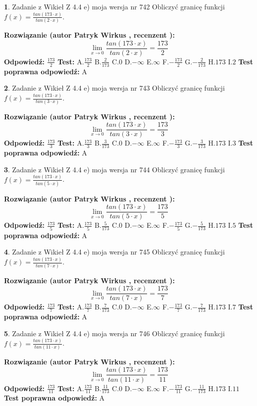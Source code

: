 \documentclass[12pt, a4paper]{article}
\theoremstyle{definition} %
\newtheorem{zad}{}
\newcommand{\zadStart}[1]{\begin{zad}#1\newline}
\newcommand{\zadStop}{\end{zad}}
\newcommand{\rozwStart}[2]{\noindent \textbf{Rozwiązanie (autor #1 , recenzent #2): }\newline}
\newcommand{\rozwStop}{\newline}
\newcommand{\odpStart}{\noindent \textbf{Odpowiedź:}\newline}
\newcommand{\odpStop}{\newline}
\newcommand{\testStart}{\noindent \textbf{Test:}\newline}
\newcommand{\testStop}{\newline}
\newcommand{\kluczStart}{\noindent \textbf{Test poprawna odpowiedź:}\newline}
\newcommand{\kluczStop}{\newline}
\begin{document}
\zadStart{Zadanie z Wikieł Z 4.4 e) moja wersja nr 742}
Obliczyć granicę funkcji $f(x)=\frac{tan(173\cdot x)}{tan(2\cdot x)}$.
\zadStop
\rozwStart{Patryk Wirkus}{}
$$\lim\limits_{x\to 0}\frac{tan(173\cdot x)}{tan(2\cdot x)}=
\frac{173}{2}$$
\rozwStop
\odpStart
$\frac{173}{2}$
\odpStop
\testStart
A.$\frac{173}{2}$
B.$\frac{2}{173}$
C.$0$
D.$-\infty$
E.$\infty$
F.$-\frac{173}{2}$
G.$-\frac{2}{173}$
H.$173$
I.$2$
\testStop
\kluczStart
A
\kluczStop



\zadStart{Zadanie z Wikieł Z 4.4 e) moja wersja nr 743}
Obliczyć granicę funkcji $f(x)=\frac{tan(173\cdot x)}{tan(3\cdot x)}$.
\zadStop
\rozwStart{Patryk Wirkus}{}
$$\lim\limits_{x\to 0}\frac{tan(173\cdot x)}{tan(3\cdot x)}=
\frac{173}{3}$$
\rozwStop
\odpStart
$\frac{173}{3}$
\odpStop
\testStart
A.$\frac{173}{3}$
B.$\frac{3}{173}$
C.$0$
D.$-\infty$
E.$\infty$
F.$-\frac{173}{3}$
G.$-\frac{3}{173}$
H.$173$
I.$3$
\testStop
\kluczStart
A
\kluczStop



\zadStart{Zadanie z Wikieł Z 4.4 e) moja wersja nr 744}
Obliczyć granicę funkcji $f(x)=\frac{tan(173\cdot x)}{tan(5\cdot x)}$.
\zadStop
\rozwStart{Patryk Wirkus}{}
$$\lim\limits_{x\to 0}\frac{tan(173\cdot x)}{tan(5\cdot x)}=
\frac{173}{5}$$
\rozwStop
\odpStart
$\frac{173}{5}$
\odpStop
\testStart
A.$\frac{173}{5}$
B.$\frac{5}{173}$
C.$0$
D.$-\infty$
E.$\infty$
F.$-\frac{173}{5}$
G.$-\frac{5}{173}$
H.$173$
I.$5$
\testStop
\kluczStart
A
\kluczStop



\zadStart{Zadanie z Wikieł Z 4.4 e) moja wersja nr 745}
Obliczyć granicę funkcji $f(x)=\frac{tan(173\cdot x)}{tan(7\cdot x)}$.
\zadStop
\rozwStart{Patryk Wirkus}{}
$$\lim\limits_{x\to 0}\frac{tan(173\cdot x)}{tan(7\cdot x)}=
\frac{173}{7}$$
\rozwStop
\odpStart
$\frac{173}{7}$
\odpStop
\testStart
A.$\frac{173}{7}$
B.$\frac{7}{173}$
C.$0$
D.$-\infty$
E.$\infty$
F.$-\frac{173}{7}$
G.$-\frac{7}{173}$
H.$173$
I.$7$
\testStop
\kluczStart
A
\kluczStop



\zadStart{Zadanie z Wikieł Z 4.4 e) moja wersja nr 746}
Obliczyć granicę funkcji $f(x)=\frac{tan(173\cdot x)}{tan(11\cdot x)}$.
\zadStop
\rozwStart{Patryk Wirkus}{}
$$\lim\limits_{x\to 0}\frac{tan(173\cdot x)}{tan(11\cdot x)}=
\frac{173}{11}$$
\rozwStop
\odpStart
$\frac{173}{11}$
\odpStop
\testStart
A.$\frac{173}{11}$
B.$\frac{11}{173}$
C.$0$
D.$-\infty$
E.$\infty$
F.$-\frac{173}{11}$
G.$-\frac{11}{173}$
H.$173$
I.$11$
\testStop
\kluczStart
A
\kluczStop
\end{document}
